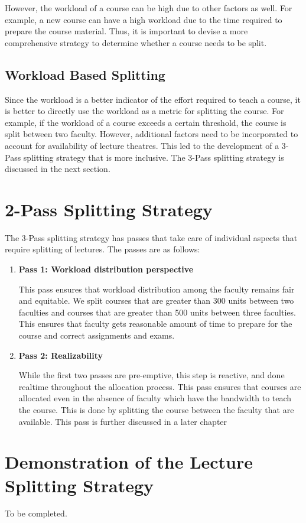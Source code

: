 However, the workload of a course can be high due to other factors as well. For example, a new course can have a high workload due to the time required to prepare the course material. Thus, it is important to devise a more comprehensive strategy to determine whether a course needs to be split.

\subsection{Workload Based Splitting}

Since the workload is a better indicator of the effort required to teach a course, it is better to directly use the workload as a metric for splitting the course. For example, if the workload of a course exceeds a certain threshold, the course is split between two faculty. However, additional factors need to be incorporated to account for availability of lecture theatres. This led to the development of a 3-Pass splitting strategy that is more inclusive. The 3-Pass splitting strategy is discussed in the next section.

\section{2-Pass Splitting Strategy}

The 3-Pass splitting strategy has passes that take care of individual aspects that require splitting of lectures. The passes are as follows:

\begin{enumerate}
  \item \textbf{Pass 1: Workload distribution perspective}

        This pass ensures that workload distribution among the faculty remains fair and equitable. We split courses that are greater than 300 units between two faculties and courses that are greater than 500 units between three faculties. This ensures that faculty gets reasonable amount of time to prepare for the course and correct assignments and exams.

  \item \textbf{Pass 2: Realizability}

        While the first two passes are pre-emptive, this step is reactive, and done realtime throughout the allocation process. This pass ensures that courses are allocated even in the absence of faculty which have the bandwidth to teach the course. This is done by splitting the course between the faculty that are available. This pass is further discussed in a later chapter
\end{enumerate}

\section{Demonstration of the Lecture Splitting Strategy}

To be completed.

